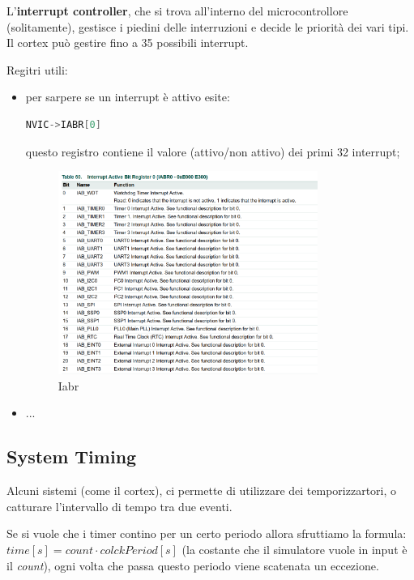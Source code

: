 \documentclass[12pt]{article}
\begin{document}
L'\textbf{interrupt controller}, che si trova all'interno del microcontrollore (solitamente), gestisce i piedini delle interruzioni e decide le priorit\`a dei vari tipi. Il cortex pu\`o gestire fino a 35 possibili interrupt.

Regitri utili:
\begin{itemize}
    \item per sarpere se un interrupt \`e attivo esite:
\begin{lstlisting}[language=c]
NVIC->IABR[0]
\end{lstlisting}
    questo registro contiene il valore (attivo/non attivo) dei primi 32 interrupt;
    \begin{figure}[H]
        \centering
        \includegraphics[width=0.8\textwidth]{iabr.png}
        \caption{Iabr}
        \label{fig:iabr}
    \end{figure}
    \item ...
\end{itemize}


\subsection{System Timing}
Alcuni sistemi (come il cortex), ci permette di utilizzare dei temporizzartori, o catturare l'intervallo di tempo tra due eventi.

Se si vuole che i timer contino per un certo periodo allora sfruttiamo la formula: $time[s] = count \cdot colckPeriod[s]$ (la costante che il simulatore vuole in input \`e il \emph{count}), ogni volta che passa questo periodo viene scatenata un eccezione.
\end{document}
